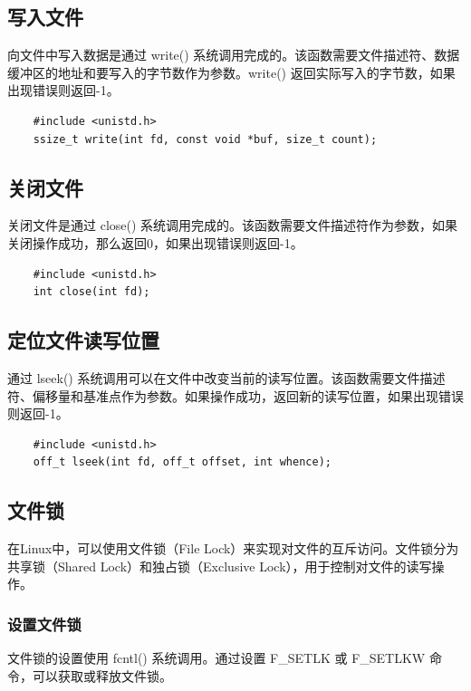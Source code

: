 \documentclass[12pt, a4paper, oneside]{ctexbook}
\numberwithin{figure}{section}
\begin{document}
\subsection{写入文件}

向文件中写入数据是通过 write() 系统调用完成的。该函数需要文件描述符、数据缓冲区的地址和要写入的字节数作为参数。write() 返回实际写入的字节数，如果出现错误则返回-1。

\begin{verbatim}
    #include <unistd.h>
    ssize_t write(int fd, const void *buf, size_t count);
\end{verbatim}

\subsection{关闭文件}

关闭文件是通过 close() 系统调用完成的。该函数需要文件描述符作为参数，如果关闭操作成功，那么返回0，如果出现错误则返回-1。

\begin{verbatim}
    #include <unistd.h>
    int close(int fd);
\end{verbatim}

\subsection{定位文件读写位置}

通过 lseek() 系统调用可以在文件中改变当前的读写位置。该函数需要文件描述符、偏移量和基准点作为参数。如果操作成功，返回新的读写位置，如果出现错误则返回-1。

\begin{verbatim}
    #include <unistd.h>
    off_t lseek(int fd, off_t offset, int whence);
\end{verbatim}


\subsection{文件锁}

在Linux中，可以使用文件锁（File Lock）来实现对文件的互斥访问。文件锁分为共享锁（Shared Lock）和独占锁（Exclusive Lock），用于控制对文件的读写操作。

\subsubsection{设置文件锁}

文件锁的设置使用 fcntl() 系统调用。通过设置 F_SETLK 或 F_SETLKW 命令，可以获取或释放文件锁。
\end{document}
